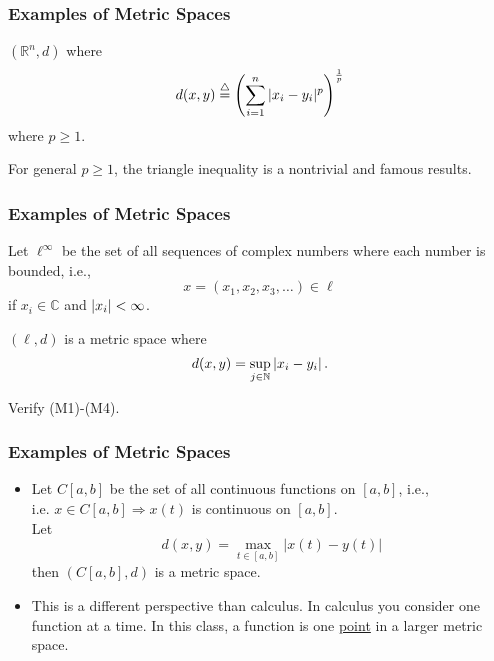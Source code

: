 \documentclass{beamer}
\begin{document}
\begin{frame}\frametitle{Examples of Metric Spaces}

\begin{example}[E3]

$(\mathbb{R}^n, d)$ where 
\[
d(x,y) \stackrel{\triangle}{=} \left( \sum_{i=1}^{n} |x_i - y_i|^p \right)^{\frac{1}{p}}
\]
where $p\geq 1$.

For general $p\geq 1$, the triangle inequality is a nontrivial and famous results.
\end{example}

\end{frame}

\begin{frame}\frametitle{Examples of Metric Spaces}

\begin{example}

Let $\boldsymbol{\ell}^\infty$ be the set of all sequences of complex numbers where each number is bounded, i.e., 
\[
x = (x_1, x_2, x_3, \dots) \in \boldsymbol{\ell}
\]
if $x_i\in\mathbb{C}$ and $\left|x_i\right|<\infty$.

$(\boldsymbol{\ell}, d)$ is a metric space where
\[
d(x, y) = \sup_{j\in\mathbb{N}} \left|x_i - y_i\right|.
\]
\end{example}

Verify (M1)-(M4).
\end{frame}

\begin{frame}\frametitle{Examples of Metric Spaces}

\begin{example}
\begin{itemize}
\item Let $C[a,b]$ be the set of all continuous functions on $[a,b]$, i.e., \\
\indent \indent i.e. $ x \in C[a,b] \Rightarrow x(t) $ is continuous on $[a,b]$.\\
Let 
\[ 
d(x,y) = \max_{t \in [a,b]} |x(t)-y(t)| 
\]
then $(C[a, b], d)$ is a metric space.

\item This is a different perspective than calculus.  In calculus you consider one function at a time.  In this class, a function is one \underline{point} in a larger metric space.
\end{itemize}
\end{example}
\end{frame}
\end{document}
